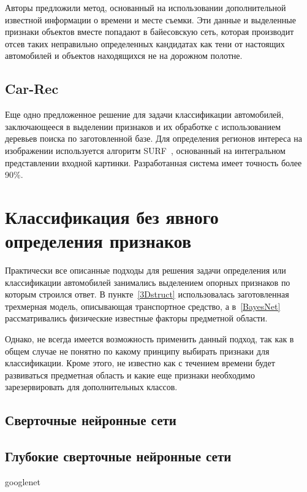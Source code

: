 \documentclass[a4paper,14pt]{extarticle} %
\begin{document}
Авторы предложили метод, основанный на использовании дополнительной известной информации о времени и месте съемки. Эти данные и выделенные признаки объектов вместе попадают в байесовскую сеть, которая производит отсев таких неправильно определенных кандидатах как тени от настоящих автомобилей и объектов находящихся не на дорожном полотне. 

\subsection[Car-Rec]{Car-Rec~\cite{jang2011car}}
\hspace{\parindent} Еще одно предложенное решение для задачи классификации автомобилей, заключающееся в выделении признаков и их обработке с использованием деревьев поиска по заготовленной базе. Для определения регионов интереса на изображении используется алгоритм SURF~\cite{bay2008speeded}, основанный на интегральном представлении входной картинки. Разработанная система имеет точность более 90\%.

\section{Классификация без явного определения признаков}
\hspace{\parindent} Практически все описанные подходы для решения задачи определения или классификации автомобилей занимались выделением опорных признаков по которым строился ответ. В пункте~\ref{3Dstruct} использовалась заготовленная трехмерная модель, описывающая транспортное средство, а в~\ref{BayesNet} рассматривались физические известные факторы предметной области.

Однако, не всегда имеется возможность применить данный подход, так как в общем случае не понятно по какому принципу выбирать признаки для классификации. Кроме этого, не известно как с течением времени будет развиваться предметная область и какие еще признаки необходимо зарезервировать для дополнительных классов.

\subsection{Сверточные нейронные сети}
\hspace{\parindent}

\subsection{Глубокие сверточные нейронные сети}
\hspace{\parindent}
googlenet
\end{document}
